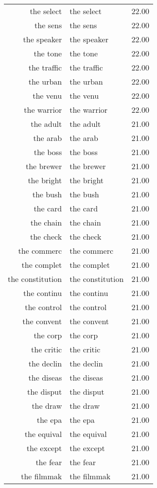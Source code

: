 \begin{table}[ht]
\begin{tabular}{rlr}
  the select & the select & 22.00 \\ 
  the sens & the sens & 22.00 \\ 
  the speaker & the speaker & 22.00 \\ 
  the tone & the tone & 22.00 \\ 
  the traffic & the traffic & 22.00 \\ 
  the urban & the urban & 22.00 \\ 
  the venu & the venu & 22.00 \\ 
  the warrior & the warrior & 22.00 \\ 
  the adult & the adult & 21.00 \\ 
  the arab & the arab & 21.00 \\ 
  the boss & the boss & 21.00 \\ 
  the brewer & the brewer & 21.00 \\ 
  the bright & the bright & 21.00 \\ 
  the bush & the bush & 21.00 \\ 
  the card & the card & 21.00 \\ 
  the chain & the chain & 21.00 \\ 
  the check & the check & 21.00 \\ 
  the commerc & the commerc & 21.00 \\ 
  the complet & the complet & 21.00 \\ 
  the constitution & the constitution & 21.00 \\ 
  the continu & the continu & 21.00 \\ 
  the control & the control & 21.00 \\ 
  the convent & the convent & 21.00 \\ 
  the corp & the corp & 21.00 \\ 
  the critic & the critic & 21.00 \\ 
  the declin & the declin & 21.00 \\ 
  the diseas & the diseas & 21.00 \\ 
  the disput & the disput & 21.00 \\ 
  the draw & the draw & 21.00 \\ 
  the epa & the epa & 21.00 \\ 
  the equival & the equival & 21.00 \\ 
  the except & the except & 21.00 \\ 
  the fear & the fear & 21.00 \\ 
  the filmmak & the filmmak & 21.00 \\ 

\end{tabular}
\end{table}
